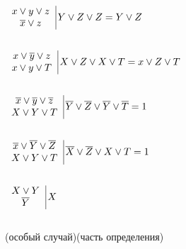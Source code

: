 \documentclass[russian]{lecture-notes}
\begin{document}
    \begin{example}
        $
        \left.
        \begin{array}{c}
            x \lor y \lor z     \\
            \overline{x} \lor z \\
        \end{array}
        \right. \vline Y \lor Z \lor Z = Y \lor Z
        $

        $ $

        $
        \left.
        \begin{array}{c}
            x \lor \overline{y} \lor z \\
            x \lor y \lor T            \\
        \end{array}
        \right. \vline X \lor Z \lor X \lor T = x \lor Z \lor T
        $


        $ $

        $
        \left.
        \begin{array}{c}
            \overline{x} \lor \overline{y} \lor \overline{z} \\
            X \lor Y \lor T                                  \\
        \end{array}
        \right. \vline \overline{Y} \lor \overline{Z} \lor \overline{Y} \lor \overline{T} = 1
        $

        $ $


        $
        \left.
        \begin{array}{c}
            \overline{x} \lor \overline{Y} \lor \overline{Z} \\
            X \lor Y \lor T                                  \\
        \end{array}
        \right. \vline \overline{X} \lor \overline{Z} \lor X \lor T = 1
        $


        $ $


        $
        \left.
        \begin{array}{c}
            X \lor Y     \\
            \overline{Y} \\
        \end{array}
        \right. \vline X
        $

        $ $


        (особый случай)(часть определения)

        $ $



\end{example}
\end{document}
